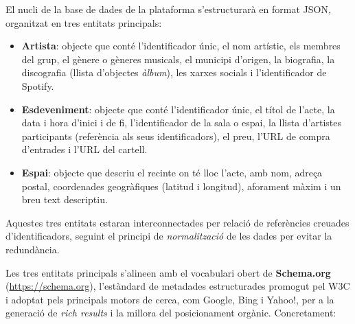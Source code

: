 El nucli de la base de dades de la plataforma s'estructurarà en format JSON, organitzat en tres entitats principals:

\begin{itemize}
    \item \textbf{Artista}: objecte que conté l'identificador únic, el nom artístic, els membres del grup, el gènere o gèneres musicals, el municipi d'origen, la biografia, la discografia (llista d'objectes \textit{àlbum}), les xarxes socials i l'identificador de Spotify.
    \item \textbf{Esdeveniment}: objecte que conté l'identificador únic, el títol de l'acte, la data i hora d'inici i de fi, l'identificador de la sala o espai, la llista d'artistes participants (referència als seus identificadors), el preu, l'URL de compra d'entrades i l'URL del cartell.
    \item \textbf{Espai}: objecte que descriu el recinte on té lloc l'acte, amb nom, adreça postal, coordenades geogràfiques (latitud i longitud), aforament màxim i un breu text descriptiu.
\end{itemize}

Aquestes tres entitats estaran interconnectades per relació de referències creuades d'identificadors, seguint el principi de \textit{normalització} de les dades per evitar la redundància.

Les tres entitats principals s'alineen amb el vocabulari obert de \textbf{Schema.org} (\url{https://schema.org}), l'estàndard de metadades estructurades promogut pel W3C i adoptat pels principals motors de cerca, com Google, Bing i Yahoo!, per a la generació de \textit{rich results} i la millora del posicionament orgànic. Concretament:

